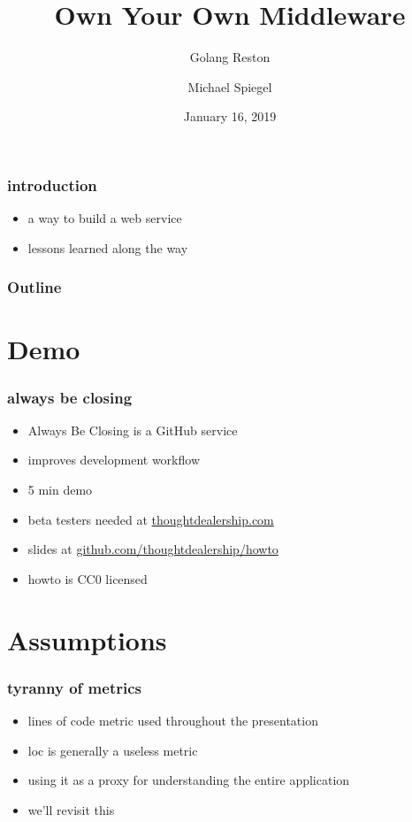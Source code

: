 \documentclass{beamer}
\title{Own Your Own Middleware}
\subtitle{Golang Reston}
\author{Michael Spiegel}
\date{January 16, 2019}
\begin{document}
\begin{frame}
\titlepage
\end{frame}

\begin{frame}
\frametitle{introduction}
\begin{itemize}
\item a way to build a web service
\item lessons learned along the way
\end{itemize}
\end{frame}

\begin{frame}
\frametitle{Outline}
\tableofcontents
\end{frame}

\section{Demo}
\begin{frame}
\frametitle{always be closing}
\begin{itemize}
\item Always Be Closing is a GitHub service
\item improves development workflow
\item 5 min demo
\pause
\item beta testers needed at \href{https://thoughtdealership.com}{thoughtdealership.com}
\item slides at \href{https://github.com/thoughtdealership/howto}{github.com/thoughtdealership/howto}
\item howto is CC0 licensed
\end{itemize}
\end{frame}

\section{Assumptions}
\begin{frame}
\frametitle{tyranny of metrics}
\begin{itemize}
\item lines of code metric used throughout the presentation
\item loc is generally a useless metric
\item using it as a proxy for understanding the entire application
\item we'll revisit this
\end{itemize}
\end{frame}
\end{document}
